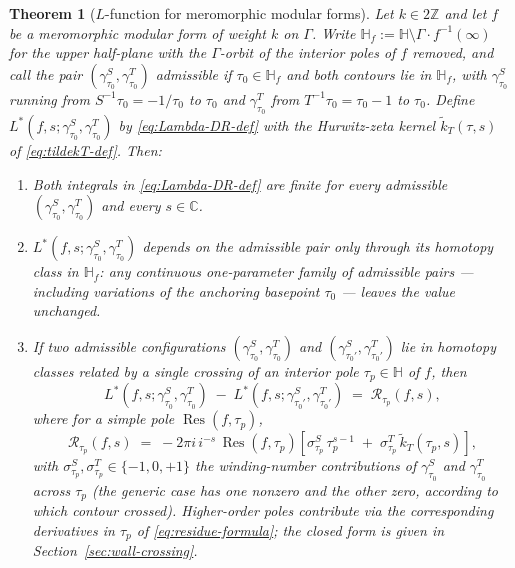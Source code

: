 \documentclass[11pt]{article}
\newtheorem{theorem}{Theorem}[section]
\numberwithin{equation}{section}  %
\newcommand{\HH}{\mathbb{H}}
\newcommand{\ZZ}{\mathbb{Z}}
\newcommand{\CC}{\mathbb{C}}
\DeclareMathOperator{\Res}{Res}
\begin{document}
\begin{theorem}[$L$-function for meromorphic modular forms]\label{thm:wall-crossing}
Let $k \in 2\ZZ$ and let $f$ be a meromorphic modular form of weight
$k$ on $\Gamma$.  Write $\HH_f := \HH \setminus \Gamma\cdot
f^{-1}(\infty)$ for the upper half-plane with the $\Gamma$-orbit of
the interior poles of $f$ removed, and call the pair
$(\gamma^S_{\tau_0}, \gamma^T_{\tau_0})$ \emph{admissible} if
$\tau_0 \in \HH_f$ and both contours lie in $\HH_f$, with
$\gamma^S_{\tau_0}$ running from $S^{-1}\tau_0 = -1/\tau_0$ to $\tau_0$
and $\gamma^T_{\tau_0}$ from $T^{-1}\tau_0 = \tau_0 - 1$ to $\tau_0$.
Define $L^*(f, s; \gamma^S_{\tau_0}, \gamma^T_{\tau_0})$ by
\eqref{eq:Lambda-DR-def} with the Hurwitz-zeta kernel
$\widetilde{k}_T(\tau, s)$ of \eqref{eq:tildekT-def}.  Then:
\begin{enumerate}[label=(\alph*),leftmargin=2em]\itemsep0.25em
\item Both integrals in \eqref{eq:Lambda-DR-def} are finite for every
  admissible $(\gamma^S_{\tau_0}, \gamma^T_{\tau_0})$ and every $s \in
  \CC$.
\item $L^*(f, s; \gamma^S_{\tau_0}, \gamma^T_{\tau_0})$ depends on the
  admissible pair only through its homotopy class in $\HH_f$: any
  continuous one-parameter family of admissible pairs --- including
  variations of the anchoring basepoint $\tau_0$ --- leaves the value
  unchanged.
\item If two admissible configurations $(\gamma^S_{\tau_0},
  \gamma^T_{\tau_0})$ and $(\gamma^S_{\tau_0'}, \gamma^T_{\tau_0'})$ lie
  in homotopy classes related by a single crossing of an interior
  pole $\tau_p \in \HH$ of $f$, then
\begin{equation}\label{eq:wall-crossing-statement}
  L^*(f, s; \gamma^S_{\tau_0}, \gamma^T_{\tau_0})
  \;-\;
  L^*(f, s; \gamma^S_{\tau_0'}, \gamma^T_{\tau_0'})
  \;=\; \mathcal{R}_{\tau_p}(f, s),
\end{equation}
where for a simple pole $\Res(f, \tau_p)$,
\begin{equation}\label{eq:residue-formula}
  \mathcal{R}_{\tau_p}(f, s)
  \;=\; -2\pi i\,i^{-s}\,\Res(f, \tau_p)\!
  \left[\sigma^S_{\tau_p}\,\tau_p^{s - 1}
  \;+\; \sigma^T_{\tau_p}\,\widetilde{k}_T(\tau_p, s)\right],
\end{equation}
with $\sigma^S_{\tau_p}, \sigma^T_{\tau_p} \in \{-1, 0, +1\}$ the
winding-number contributions of $\gamma^S_{\tau_0}$ and $\gamma^T_{\tau_0}$ across
$\tau_p$ (the generic case has one nonzero and the other zero,
according to which contour crossed).  Higher-order poles contribute
via the corresponding derivatives in $\tau_p$ of
\eqref{eq:residue-formula}; the closed form is given in
Section~\ref{sec:wall-crossing}.
\end{enumerate}
\end{theorem}%
\end{document}
